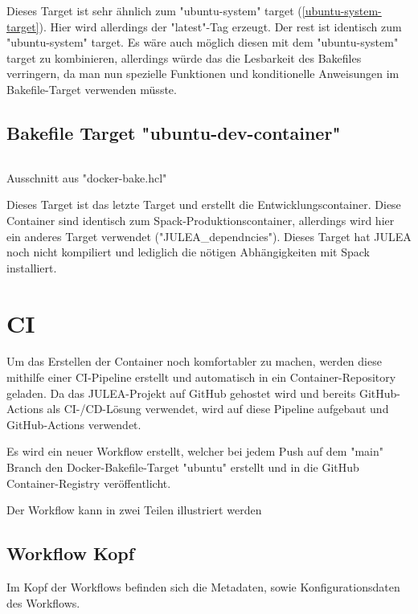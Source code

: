 Dieses Target ist sehr ähnlich zum "ubuntu-system" target (\cref{ubuntu-system-target}). Hier wird allerdings der "latest"-Tag erzeugt. 
Der rest ist identisch zum "ubuntu-system" target. Es wäre auch möglich diesen mit dem "ubuntu-system" target zu kombinieren, allerdings würde das die Lesbarkeit des Bakefiles verringern, da man nun spezielle Funktionen und konditionelle Anweisungen im Bakefile-Target verwenden müsste.



\subsection{Bakefile Target "ubuntu-dev-container"}

\begin{listing}[H]
    \inputminted[firstline=58]{./lexers/docker-bake-lexer.py}{./code-examples/docker-bake.hcl}
    \caption{Ausschnitt aus "docker-bake.hcl"}
\end{listing}

Dieses Target ist das letzte Target und erstellt die Entwicklungscontainer. Diese Container sind identisch zum Spack-Produktionscontainer, allerdings wird hier ein anderes Target verwendet ("JULEA\_dependncies"). Dieses Target hat JULEA noch nicht kompiliert und lediglich die nötigen Abhängigkeiten mit Spack installiert.

\pagebreak

\section{CI}

Um das Erstellen der Container noch komfortabler zu machen, werden diese mithilfe einer CI-Pipeline erstellt und automatisch in ein Container-Repository geladen. Da das JULEA-Projekt auf GitHub gehostet wird und bereits GitHub-Actions als CI-/CD-Lösung verwendet, wird auf diese Pipeline aufgebaut und GitHub-Actions verwendet.

Es wird ein neuer Workflow erstellt, welcher bei jedem Push auf dem "main" Branch den Docker-Bakefile-Target "ubuntu" erstellt und in die GitHub Container-Registry veröffentlicht.

Der Workflow kann in zwei Teilen illustriert werden 


\subsection{Workflow Kopf}

Im Kopf der Workflows befinden sich die Metadaten, sowie Konfigurationsdaten des Workflows.

